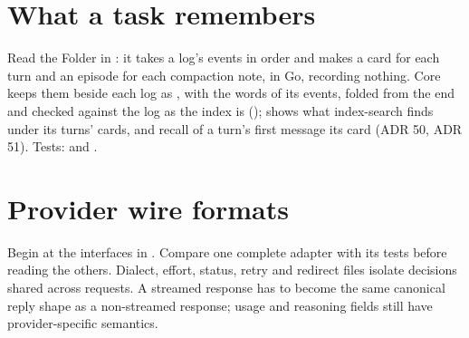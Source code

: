 



\chapter{What a task remembers}

Read the Folder in : it takes a log's events in order and makes a card for each turn and an episode for each compaction note, in Go, recording nothing. Core keeps them beside each log as , with the words of its events, folded from the end and checked against the log as the index is ();  shows what index-search finds under its turns' cards, and recall of a turn's first message its card (ADR 50, ADR 51). Tests:  and .


\chapter{Provider wire formats}

Begin at the interfaces in . Compare one complete adapter with its tests before reading the others. Dialect, effort, status, retry and redirect files isolate decisions shared across requests. A streamed response has to become the same canonical reply shape as a non-streamed response; usage and reasoning fields still have provider-specific semantics.










